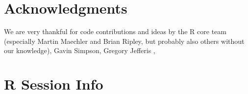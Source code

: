\documentclass[shortnames,nojss,article]{jss}\usepackage[]{graphicx}\usepackage[]{color}
\begin{document}
% 
% 



\section*{Acknowledgments}

We are very thankful for code contributions and ideas by the R core team (especially Martin Maechler and Brian Ripley, but probably also others without our knowledge), Gavin Simpson, Gregory Jefferis
,




\vspace*{-0.35cm}




\section*{R Session Info}
\end{document}
